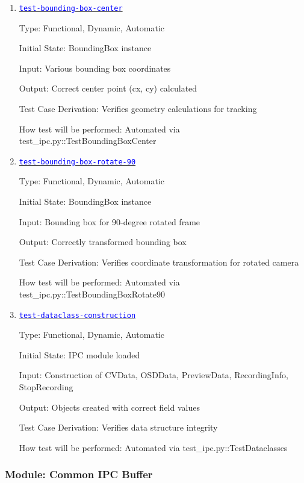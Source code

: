 \documentclass[12pt, titlepage]{article}
\newcommand{\tid}[1]{\hyperlink{tid:#1}{\textcolor{blue}{\texttt{#1}}}}
\begin{document}
\begin{enumerate}

  \item{\tid{test-bounding-box-center}\\}

        Type: Functional, Dynamic, Automatic

        Initial State: BoundingBox instance

        Input: Various bounding box coordinates

        Output: Correct center point (cx, cy) calculated

        Test Case Derivation: Verifies geometry calculations for tracking

        How test will be performed: Automated via test\_ipc.py::TestBoundingBoxCenter

  \item{\tid{test-bounding-box-rotate-90}\\}

        Type: Functional, Dynamic, Automatic

        Initial State: BoundingBox instance

        Input: Bounding box for 90-degree rotated frame

        Output: Correctly transformed bounding box

        Test Case Derivation: Verifies coordinate transformation for rotated camera

        How test will be performed: Automated via test\_ipc.py::TestBoundingBoxRotate90

  \item{\tid{test-dataclass-construction}\\}

        Type: Functional, Dynamic, Automatic

        Initial State: IPC module loaded

        Input: Construction of CVData, OSDData, PreviewData, RecordingInfo,
        StopRecording

        Output: Objects created with correct field values

        Test Case Derivation: Verifies data structure integrity

        How test will be performed: Automated via test\_ipc.py::TestDataclasses

\end{enumerate}

\subsubsection{Module: Common IPC Buffer}
\end{document}
